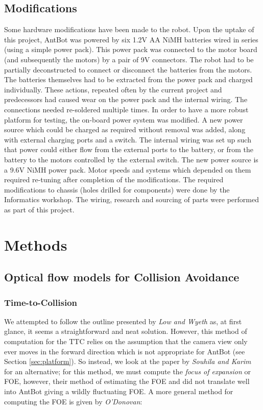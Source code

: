 \documentclass[a4paper,12pt,twoside,openright]{article}
\begin{document}
\subsection{Modifications}
Some hardware modifications have been made to the robot. Upon the uptake of this project, AntBot
was powered by six 1.2V AA NiMH batteries wired in series (using a simple power pack). This power
pack was connected to the motor board (and subsequently the motors) by a pair of 9V connectors. The robot
had to be partially deconstructed to connect or disconnect the batteries from the motors. The batteries themselves
had to be extracted from the power pack and charged individually. These actions, repeated often by the current
project and predecessors had caused wear on the power pack and the internal wiring. The connections
needed re-soldered multiple times. In order to have a more robust platform for testing, the on-board
power system was modified. 
A new power source which could be charged as required without removal was added, along with external
charging ports and a switch. The internal wiring was set up such that power could either flow from the
external ports to the battery, or from the battery to the motors controlled by the external switch. The new
power source is a 9.6V NiMH power pack. Motor speeds and systems which depended on them required re-tuning
after completion of the modifications. The required modifications to chassis (holes drilled for components)
were done by the Informatics workshop. The wiring, research and sourcing of parts were performed as part
of this project.
\newpage

\section{ Methods } \label{sec:methods}
\subsection{Optical flow models for Collision Avoidance}
\subsubsection{Time-to-Collision}
We attempted to follow the outline presented by \textit{Low and Wyeth} as, at first glance, it seems
a straightforward and neat solution. However, this method of computation for the TTC relies on the
assumption that the camera view only ever moves in the forward direction \cite{Low2005} which is not appropriate
for AntBot (see Section \ref{sec:platform}). So instead, we look at the paper by \textit{Souhila and Karim}
for an alternative; for this method, we must compute the \textit{focus of expansion} or FOE, however,
their method of estimating the FOE and did not translate well into AntBot giving a wildly fluctuating FOE.
A more general method for computing the FOE is given by \textit{O'Donovan}\cite{ODonovan2005}:
\end{document}
